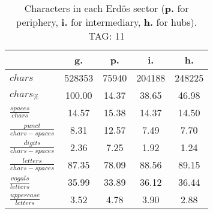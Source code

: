 \begin{table}[h!]
\begin{center}
\begin{tabular}{| l || c | c | c | c |}\hline
 & {\bf g.} & {\bf p.} & {\bf i.} & {\bf h.} \\\hline\hline
$chars$ & 528353  & 75940  & 204188  & 248225 \\
$chars_{\%}$ & 100.00  & 14.37  & 38.65  & 46.98 \\\hline
$\frac{spaces}{chars}$ & 14.57  & 15.38  & 14.37  & 14.50 \\
$\frac{punct}{chars-spaces}$ & 8.31  & 12.57  & 7.49  & 7.70 \\
$\frac{digits}{chars-spaces}$ & 2.36  & 7.25  & 1.92  & 1.24 \\\hline
$\frac{letters}{chars-spaces}$ & 87.35  & 78.09  & 88.56  & 89.15 \\
$\frac{vogals}{letters}$ & 35.99  & 33.89  & 36.12  & 36.44 \\
$\frac{uppercase}{letters}$ & 3.52  & 4.78  & 3.90  & 2.88 \\\hline
\end{tabular}
\caption{Characters in each Erd\"os sector ({{\bf p.}} for periphery, {{\bf i.}} for intermediary, 
    {{\bf h.}} for hubs). TAG: 11}
\end{center}
\end{table}